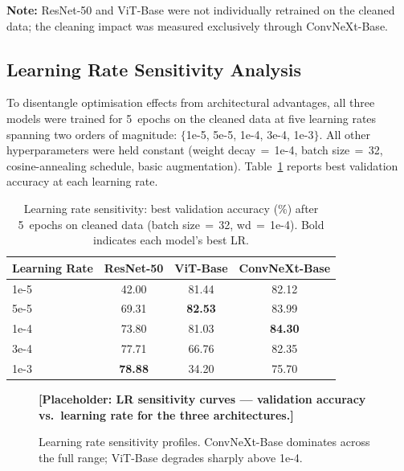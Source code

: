 \textbf{Note:} ResNet-50 and ViT-Base were not individually retrained
on the cleaned data; the cleaning impact was measured exclusively
through ConvNeXt-Base.

\subsection{Learning Rate Sensitivity Analysis}\label{sec:lr-sensitivity}

To disentangle optimisation effects from architectural advantages, all
three models were trained for 5~epochs on the cleaned data at five
learning rates spanning two orders of magnitude:
$\{$1e-5, 5e-5, 1e-4, 3e-4, 1e-3$\}$.  All other hyperparameters were
held constant (weight decay$\,{=}\,$1e-4, batch size$\,{=}\,$32,
cosine-annealing schedule, basic augmentation).
Table~\ref{tab:lr-sweep} reports best validation accuracy at each
learning rate.

\begin{table}[ht]
\centering
\caption{Learning rate sensitivity: best validation accuracy (\%) after
         5~epochs on cleaned data (batch size$\,{=}\,$32, wd$\,{=}\,$1e-4).
         Bold indicates each model's best LR.}
\label{tab:lr-sweep}
\begin{tabular}{lccc}
\toprule
\textbf{Learning Rate} & \textbf{ResNet-50} & \textbf{ViT-Base} & \textbf{ConvNeXt-Base} \\
\midrule
1e-5 & 42.00 & 81.44 & 82.12 \\
5e-5 & 69.31 & \textbf{82.53} & 83.99 \\
1e-4 & 73.80 & 81.03 & \textbf{84.30} \\
3e-4 & 77.71 & 66.76 & 82.35 \\
1e-3 & \textbf{78.88} & 34.20 & 75.70 \\
\bottomrule
\end{tabular}
\end{table}

\begin{figure}[ht]
\centering
\textbf{[Placeholder: LR sensitivity curves --- validation accuracy
vs.\ learning rate for the three architectures.]}
\caption{Learning rate sensitivity profiles.  ConvNeXt-Base dominates
         across the full range; ViT-Base degrades sharply above 1e-4.}
\label{fig:lr-sensitivity}
\end{figure}

